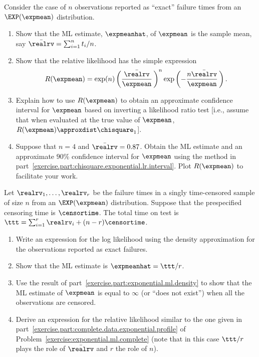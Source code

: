 \begin{exercise}
\label{exercise:exponential.ml.complete}
Consider the case of $n$ observations reported as ``exact''
failure times from an $\EXP(\expmean)$ distribution.  	 
\begin{enumerate}
\item 
Show that the ML estimate, $\expmeanhat$, of $\expmean$ is
the sample mean, say $\bar{\realrv}=\sum_{i=1}^{n}t_{i}/n$.  	 
\item 
\label{exercise.part:complete.data.exponential.profile}
Show that the relative likelihood has the simple expression
\begin{displaymath}
R(\expmean)=\exp(n) \left (\frac{\bar{\realrv}}{\expmean}\, \right )^{n}
\exp \left ( - \frac{n\bar{\realrv}}{\expmean} \,\right ).
\end{displaymath} 
\item
\label{exercise.part:chisquare.exponential.lr.interval}
Explain how to use $R(\expmean)$ to obtain an approximate confidence
interval
for $\expmean$ based on inverting a likelihood ratio test
[i.e., assume that when evaluated at the
true value of $\expmean$, $R(\expmean) \approxdist \chisquare_{1}$].
\item 
\label{exercise.part:chisquare.exponential.lr.interval.ex}
Suppose that $n=4$ and $\bar{\realrv}=0.87$. Obtain 
the ML estimate and an
approximate $90\%$ confidence interval for $\expmean$ using the
method in part~\ref{exercise.part:chisquare.exponential.lr.interval}.
Plot $R(\expmean)$ to facilitate your work.
\end{enumerate}
\end{exercise}





\begin{exercise}
\label{exercise:exponential.ml.type1.censored}
Let $\realrv_{1}, \ldots, \realrv_{r}$ be the failure times in a
singly time-censored sample of size $n$ from an $\EXP(\expmean)$
distribution. Suppose
that the prespecified censoring time is $\censortime$.
The total time on test is $\ttt=\sum_{i=1}^{r}\realrv_{i}+(n-r)\censortime$.
\begin{enumerate}
\item 
\label{exercise.part:exponential.ml.density}
Write an expression for the log likelihood using the density
approximation for the observations
reported as exact failures.
\item 
Show that the ML estimate is $\expmeanhat=\ttt/r$.  		
\item 
\label{exercise.part:exponential.ml.exist.limit.allc}
Use the result of part~\ref{exercise.part:exponential.ml.density} to show
that the ML estimate of $\expmean$ is equal to $\infty$ (or ``does not
exist'') when all the observations are censored.
\item 
Derive an expression for the relative likelihood similar to the one
given in part~\ref{exercise.part:complete.data.exponential.profile} of
Problem~\ref{exercise:exponential.ml.complete} (note that in this case
$\ttt/r$ plays the role of $\bar{\realrv}$ and $r$ the role of $n$).
\end{enumerate}
\end{exercise}

